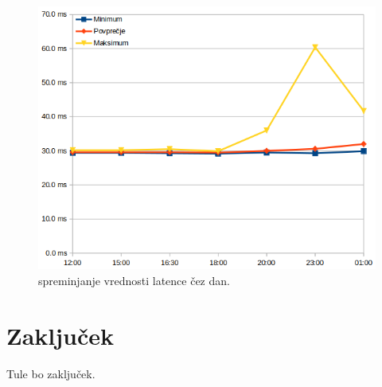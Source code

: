 \begin{figure}[H]
	\centering
	\includegraphics[scale=0.6]{Img/latenca_cez_dan.png}
	\caption{spreminjanje vrednosti latence čez dan.}
	\label{fig:6_traceroute2}
\end{figure}












\section{Zaključek}
Tule bo zaključek.

